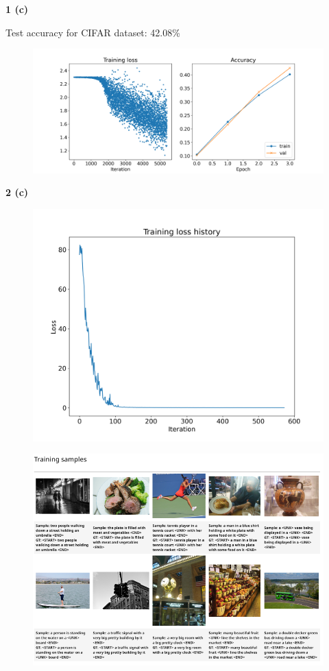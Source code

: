 \documentclass[12 pt]{article}        	%
\begin{document}

\textbf{1 (c)} 

Test accuracy for CIFAR dataset: 42.08\%

\begin{figure}[h!]
  \includegraphics[width=\linewidth]{cnn.png}
\end{figure}


\textbf{2 (c)} 

\begin{figure}[h!]
  \includegraphics[width=0.5\linewidth]{image_captioning_loss.png}
\end{figure}

\begin{figure}[h!]
  \includegraphics[width=0.7\linewidth]{captions_training.png}
\end{figure}
\end{document}
